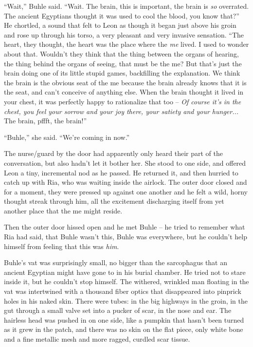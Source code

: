 “Wait,” Buhle said. “Wait. The brain, this is important, the 
brain is \emph{so} overrated. The ancient Egyptians thought it was used 
to cool the blood, you know that?” He chortled, a sound that felt to 
Leon as though it began just above his groin and rose up through his 
torso, a very pleasant and very invasive sensation. “The heart, they 
thought, the heart was the place where the \emph{me} lived. I used to 
wonder about that. Wouldn't they think that the thing between the 
organs of hearing, the thing behind the organs of seeing, that must be 
the me? But that's just the brain doing one of its little stupid games, 
backfilling the explanation. We think the brain is the obvious seat of 
the me because the brain already knows that it is the seat, and can't 
conceive of anything else. When the brain thought it lived in your 
chest, it was perfectly happy to rationalize that too -- \emph{Of 
course it's in the chest, you feel your sorrow and your joy there, your 
satiety and your hunger...} The brain, pffft, the brain!”

“Buhle,” she said. “We're coming in now.”

The nurse/guard by the door had apparently only heard their part of the 
conversation, but also hadn't let it bother her. She stood to one side, 
and offered Leon a tiny, incremental nod as he passed. He returned it, 
and then hurried to catch up with Ria, who was waiting inside the 
airlock. The outer door closed and for a moment, they were pressed up 
against one another and he felt a wild, horny thought streak through 
him, all the excitement discharging itself from yet another place that 
the me might reside.

Then the outer door hissed open and he met Buhle -- he tried to 
remember what Ria had said, that Buhle wasn't this, Buhle was 
everywhere, but he couldn't help himself from feeling that this was 
\emph{him}.

Buhle's vat was surprisingly small, no bigger than the sarcophagus that 
an ancient Egyptian might have gone to in his burial chamber. He tried 
not to stare inside it, but he couldn't stop himself. The withered, 
wrinkled man floating in the vat was intertwined with a thousand fiber 
optics that disappeared into pinprick holes in his naked skin. There 
were tubes: in the big highways in the groin, in the gut through a 
small valve set into a pucker of scar, in the nose and ear. The 
hairless head was pushed in on one side, like a pumpkin that hasn't 
been turned as it grew in the patch, and there was no skin on the flat 
piece, only white bone and a fine metallic mesh and more ragged, 
curdled scar tissue.


